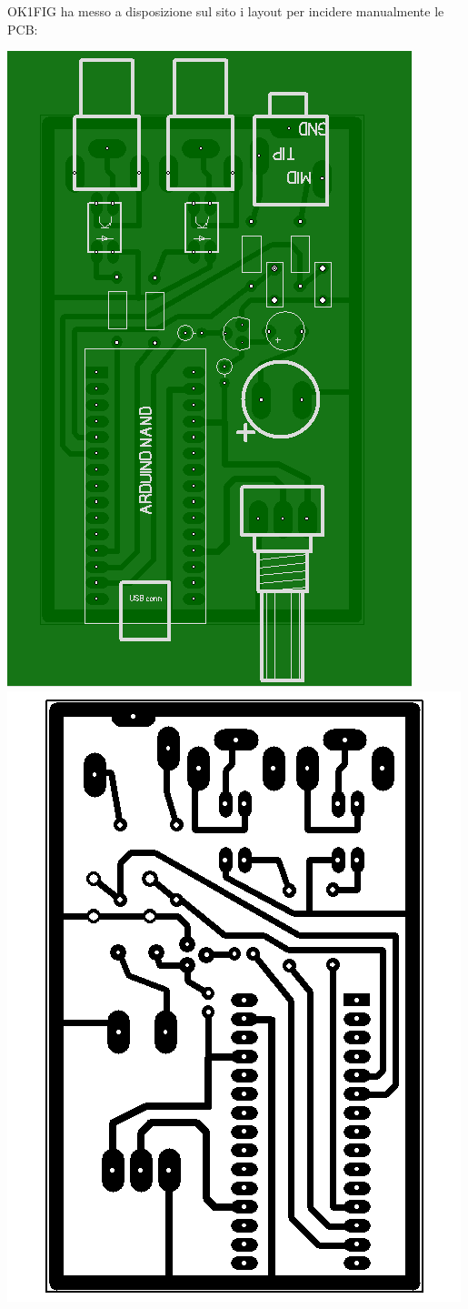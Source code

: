\begin{samepage}
	OK1FIG ha messo a disposizione sul sito i layout per incidere manualmente le PCB:
	\begin{center}
		\includegraphics[width=.5\linewidth]{./PCB_xray.png}\includegraphics[width=.5\linewidth]{./PCB_cuprum.png}
	\end{center}
\end{samepage}



